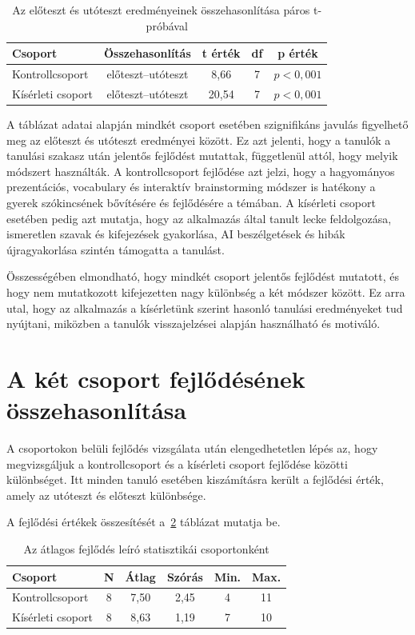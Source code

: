 \begin{table}[h!]
\centering
\begin{tabular}{lcccc}
\hline
\textbf{Csoport} & \textbf{Összehasonlítás} & \textbf{t érték} & \textbf{df} & \textbf{p érték} \\
\hline
Kontrollcsoport & előteszt--utóteszt & 8,66 & 7 & $p < 0{,}001$ \\
Kísérleti csoport & előteszt--utóteszt & 20,54 & 7 & $p < 0{,}001$ \\
\hline
\end{tabular}
\caption{Az előteszt és utóteszt eredményeinek összehasonlítása páros t-próbával}
\label{tab:eloteszt-utoteszt-t-proba}
\end{table}

A táblázat adatai alapján mindkét csoport esetében szignifikáns javulás figyelhető meg az előteszt és utóteszt eredményei között. Ez azt jelenti, hogy a tanulók a tanulási szakasz után jelentős fejlődést mutattak, függetlenül attól, hogy melyik módszert használták.
A kontrollcsoport fejlődése azt jelzi, hogy a hagyományos prezentációs, vocabulary és interaktív brainstorming módszer is hatékony a gyerek szókincsének bővítésére és fejlődésére a témában. A kísérleti csoport esetében pedig azt mutatja, hogy az alkalmazás által tanult lecke feldolgozása, ismeretlen szavak és kifejezések gyakorlása, AI beszélgetések és hibák újragyakorlása szintén támogatta a tanulást.

Összességében elmondható, hogy mindkét csoport jelentős fejlődést mutatott, és hogy nem mutatkozott kifejezetten nagy különbség a két módszer között. Ez arra utal, hogy az alkalmazás a kísérletünk szerint hasonló tanulási eredményeket tud nyújtani, miközben a tanulók visszajelzései alapján használható és motiváló.

\newpage

\section{A két csoport fejlődésének összehasonlítása}

A csoportokon belüli fejlődés vizsgálata után elengedhetetlen lépés az, hogy megvizsgáljuk a kontrollcsoport és a kísérleti csoport fejlődése közötti különbséget. Itt minden tanuló esetében kiszámításra került a fejlődési érték, amely az utóteszt és előteszt különbsége.

A fejlődési értékek összesítését a~\ref{tab:fejlodes-osszesites} táblázat mutatja be.

\begin{table}[h!]
\centering
\begin{tabular}{lccccc}
\hline
\textbf{Csoport} & \textbf{N} & \textbf{Átlag} & \textbf{Szórás} & \textbf{Min.} & \textbf{Max.} \\
\hline
Kontrollcsoport & 8 & 7,50 & 2,45 & 4 & 11 \\
Kísérleti csoport & 8 & 8,63 & 1,19 & 7 & 10 \\
\hline
\end{tabular}
\caption{Az átlagos fejlődés leíró statisztikái csoportonként}
\label{tab:fejlodes-osszesites}
\end{table}

